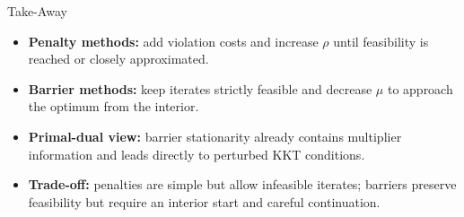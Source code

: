 \documentclass[11pt,compress,t,notes=noshow, xcolor=table]{beamer}
\begin{document}
\begin{framev}{Take-Away}
\begin{itemize}
\item \textbf{Penalty methods:} add violation costs and increase $\rho$ until feasibility is reached or closely approximated.
\item \textbf{Barrier methods:} keep iterates strictly feasible and decrease $\mu$ to approach the optimum from the interior.
\item \textbf{Primal-dual view:} barrier stationarity already contains multiplier information and leads directly to perturbed KKT conditions.
\item \textbf{Trade-off:} penalties are simple but allow infeasible iterates; barriers preserve feasibility but require an interior start and careful continuation.
\end{itemize}
\end{framev}

\endlecture
\end{document}
